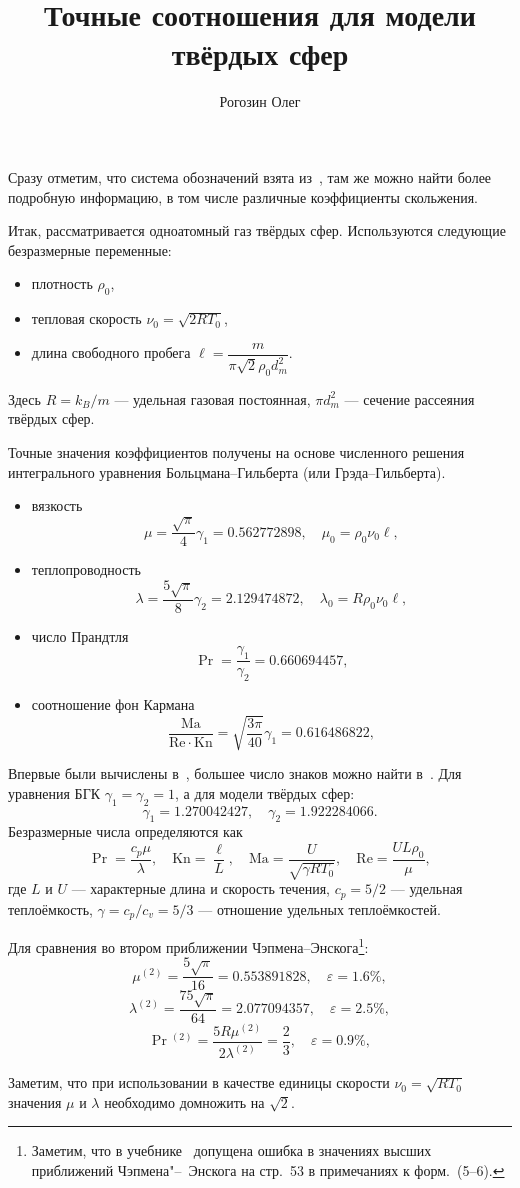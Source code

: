 \documentclass[english,russian,a4paper,12pt]{article}
\title{Точные соотношения для модели твёрдых сфер}
\author{Рогозин Олег}
\begin{document}
\maketitle

Сразу отметим, что система обозначений взята из~\cite{Sone2007}, там же можно найти более подробную информацию,
в том числе различные коэффициенты скольжения.

Итак, рассматривается одноатомный газ твёрдых сфер.
Используются следующие безразмерные переменные:
\begin{itemize}
	\item плотность \(\rho_0\),
	\item тепловая скорость \(\nu_0 = \sqrt{2RT_0}\),
	\item длина свободного пробега \(\ell = \dfrac{m}{\pi\sqrt{2}\rho_0d_m^2}\).
\end{itemize}
Здесь \(R = k_B/m\) --- удельная газовая постоянная, \(\pi d_m^2\) --- сечение рассеяния твёрдых сфер.

Точные значения коэффициентов получены на основе численного решения интегрального уравнения Больцмана--Гильберта (или Грэда--Гильберта).
\begin{itemize}
	\item вязкость \[\mu = \dfrac{\sqrt{\pi}}{4}\gamma_1 = 0.562772898, \quad \mu_0 = \rho_0\nu_0\ell, \]
	\item теплопроводность \[\lambda = \dfrac{5\sqrt{\pi}}{8}\gamma_2 = 2.129474872, \quad \lambda_0 = R\rho_0\nu_0\ell, \]
	\item число Прандтля \[\Pr = \dfrac{\gamma_1}{\gamma_2} = 0.660694457, \]
	\item соотношение фон Кармана \[\dfrac{\mathrm{Ma}}{\mathrm{Re}\cdot\mathrm{Kn}} = \sqrt{\dfrac{3\pi}{40}}\gamma_1 = 0.616486822, \]
\end{itemize}
Впервые были вычислены в~\cite{Pekeris1957}, большее число знаков можно найти в~\cite{Ohwada1989a}.
Для уравнения БГК \(\gamma_1 = \gamma_2 = 1\), а для модели твёрдых сфер:
\[
	\gamma_1 = 1.270042427, \quad \gamma_2 = 1.922284066.
\]
Безразмерные числа определяются как
\[	\Pr = \frac{c_p\mu}{\lambda}, \quad \mathrm{Kn} = \frac{\ell}{L}, \quad
	\mathrm{Ma} = \frac{U}{\sqrt{\gamma R T_0}}, \quad \mathrm{Re} = \frac{UL\rho_0}{\mu}, \]
где \(L\) и \(U\) --- характерные длина и скорость течения, \(c_p=5/2\) --- удельная теплоёмкость,
\(\gamma=c_p/c_v = 5/3\) --- отношение удельных теплоёмкостей.

Для сравнения во втором приближении Чэпмена--Энскога\footnote
{
	Заметим, что в учебнике~\cite{Landau2002} допущена ошибка в значениях высших приближений Чэпмена"--~Энскога 
	на стр.~53 в примечаниях к форм.~(5--6).
}:
\[ \mu^{(2)} = \frac{5\sqrt{\pi}}{16} = 0.553891828, \quad \varepsilon = 1.6\%, \]
\[ \lambda^{(2)} = \frac{75\sqrt{\pi}}{64} = 2.077094357, \quad \varepsilon = 2.5\%, \]
\[ \Pr{}^{(2)} = \frac{5R\mu^{(2)}}{2\lambda^{(2)}} = \frac{2}{3}, \quad \varepsilon = 0.9\%, \]

Заметим, что при использовании в качестве единицы скорости \(\nu_0 = \sqrt{RT_0}\) значения \(\mu\) и \(\lambda\)
необходимо домножить на \(\sqrt{2}\).

\printbibliography
\end{document}
